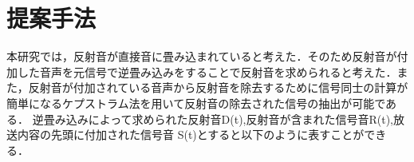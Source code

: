 \documentclass[twocolumn,10pt,a4j]{jsarticle}
\begin{document}




\section{提案手法}
本研究では，反射音が直接音に畳み込まれていると考えた．そのため反射音が付加した音声を元信号で逆畳み込みをすることで反射音を求められると考えた．また，反射音が付加されている音声から反射音を除去するために信号同士の計算が簡単になるケプストラム法を用いて反射音の除去された信号の抽出が可能である．
逆畳み込みによって求められた反射音D(t),反射音が含まれた信号音R(t),放送内容の先頭に付加された信号音
S(t)とすると以下のように表すことができる．

\end{document}
